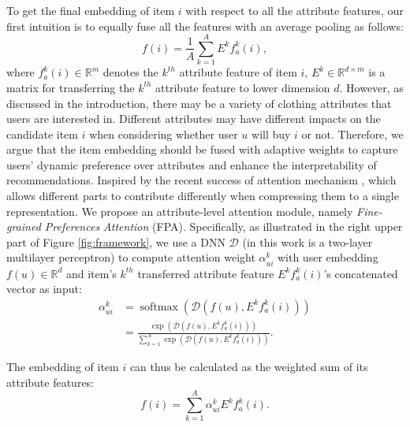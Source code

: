 \documentclass{article}
\begin{document}
To get the final embedding of item $i$ with respect to all the attribute features, our first intuition is to equally fuse all the features with an average pooling as follows: 
\begin{equation}
    f ( i ) = \frac { 1 } { A } \sum _ { k = 1 } ^ { A } E^k f_a^k(i),
\label{equation:fuse}
\end{equation}
where $f_a^k (i)\in\mathbb{R}^{m}$ denotes the $k ^ {t h}$ attribute feature of item $i$, $E^k \in\mathbb{R}^{d \times m}$ is a matrix for transferring the $k^{th}$ attribute feature to lower dimension $d$. However, as discussed in the introduction, there may be a variety of clothing attributes that users are interested in. Different attributes may have different impacts on the candidate item $i$ when considering whether user $u$ will buy $i$ or not. Therefore, we argue that the item embedding should be fused with adaptive weights to capture users' dynamic preference over attributes and enhance the interpretability of recommendations. Inspired by the recent success of attention mechanism \cite{chen2018visually}, which allows different parts to contribute differently when compressing them to a single representation. We propose an attribute-level attention module, namely \textit{Fine-grained Preferences Attention} (FPA). Specifically, as illustrated in the right upper part of Figure \ref{fig:framework}, we use a DNN $\mathcal { D }$ (in this work is a two-layer multilayer perceptron) to compute attention weight $\alpha _ { ui } ^ { k }$ with user embedding $f(u) \in \mathbb{R}^d$ and item's $k ^ {t h}$ transferred attribute feature $E^k f_a^k(i)$'s concatenated vector as input:
\begin{equation}
\begin{aligned}
    \alpha _ { ui } ^ { k } &= \operatorname { softmax } \left( \mathcal { D } \left( f(u) , E^k f_a^k(i) \right) \right) \\
    &= \frac { \exp \left( \mathcal { D } \left( f(u) , E^k f_a^k(i) \right) \right) } { \sum _ { k = 1 } ^ { A } \exp \left( \mathcal { D } \left( f(u) , E^k f_a^k(i) \right) \right) }.
\end{aligned}
\label{equation:attention}
\end{equation}

The embedding of item $i$ can thus be calculated as the weighted sum of its attribute features:
\begin{equation}
    f ( i ) = \sum _ { k = 1 } ^ { A } \alpha _ { ui } ^ { k } E^k f_a^k(i).
\end{equation}
\end{document}
